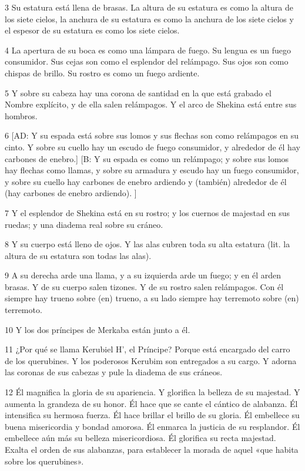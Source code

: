 \par 3 Su estatura está llena de brasas. La altura de su estatura es como la altura de los siete cielos, la anchura de su estatura es como la anchura de los siete cielos y el espesor de su estatura es como los siete cielos.

\par 4 La apertura de su boca es como una lámpara de fuego. Su lengua es un fuego consumidor. Sus cejas son como el esplendor del relámpago. Sus ojos son como chispas de brillo. Su rostro es como un fuego ardiente.

\par 5 Y sobre su cabeza hay una corona de santidad en la que está grabado el Nombre explícito, y de ella salen relámpagos. Y el arco de Shekina está entre sus hombros.

\par 6 [AD: Y su espada está sobre sus lomos y sus flechas son como relámpagos en su cinto. Y sobre su cuello hay un escudo de fuego consumidor, y alrededor de él hay carbones de enebro.] [B: Y su espada es como un relámpago; y sobre sus lomos hay flechas como llamas, y sobre su armadura y escudo hay un fuego consumidor, y sobre su cuello hay carbones de enebro ardiendo y (también) alrededor de él (hay carbones de enebro ardiendo). ]

\par 7 Y el esplendor de Shekina está en su rostro; y los cuernos de majestad en sus ruedas; y una diadema real sobre su cráneo.

\par 8 Y su cuerpo está lleno de ojos. Y las alas cubren toda su alta estatura (lit. la altura de su estatura son todas las alas).

\par 9 A su derecha arde una llama, y ​​a su izquierda arde un fuego; y en él arden brasas. Y de su cuerpo salen tizones. Y de su rostro salen relámpagos. Con él siempre hay trueno sobre (en) trueno, a su lado siempre hay terremoto sobre (en) terremoto.

\par 10 Y los dos príncipes de Merkaba están junto a él.

\par 11 ¿Por qué se llama Kerubiel H', el Príncipe? Porque está encargado del carro de los querubines. Y los poderosos Kerubim son entregados a su cargo. Y adorna las coronas de sus cabezas y pule la diadema de sus cráneos.

\par 12 Él magnifica la gloria de su apariencia. Y glorifica la belleza de su majestad. Y aumenta la grandeza de su honor. Él hace que se cante el cántico de alabanza. Él intensifica su hermosa fuerza. Él hace brillar el brillo de su gloria. Él embellece su buena misericordia y bondad amorosa. Él enmarca la justicia de su resplandor. Él embellece aún más su belleza misericordiosa. Él glorifica su recta majestad. Exalta el orden de sus alabanzas, para establecer la morada de aquel «que habita sobre los querubines».

